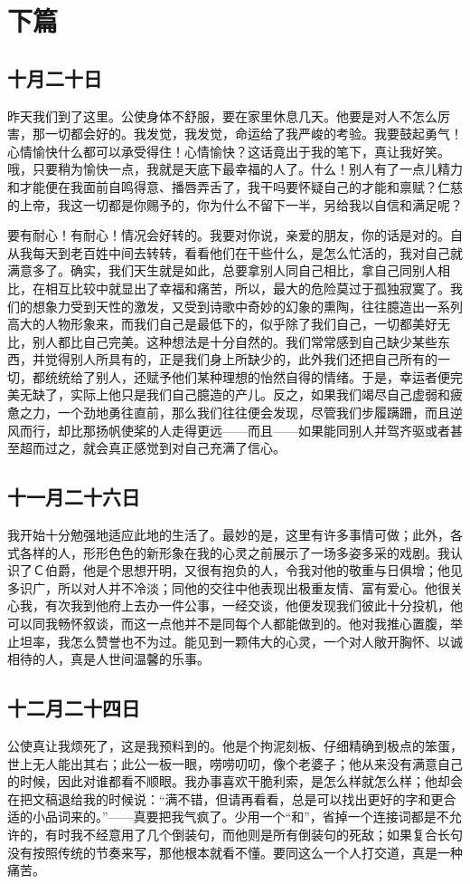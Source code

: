 \documentclass[12pt,oneside]{book}
\begin{document}
\part{下篇}
\label{sec-3}
\chapter{十月二十日}
\label{sec-3-1}
昨天我们到了这里。公使身体不舒服，要在家里休息几天。他要是对人不怎么厉害，那一切都会好的。我发觉，我发觉，命运给了我严峻的考验。我要鼓起勇气！心情愉快什么都可以承受得住！心情愉快？这话竟出于我的笔下，真让我好笑。哦，只要稍为愉快一点，我就是天底下最幸福的人了。什么！别人有了一点儿精力和才能便在我面前自鸣得意、播唇弄舌了，我干吗要怀疑自己的才能和禀赋？仁慈的上帝，我这一切都是你赐予的，你为什么不留下一半，另给我以自信和满足呢？

要有耐心！有耐心！情况会好转的。我要对你说，亲爱的朋友，你的话是对的。自从我每天到老百姓中间去转转，看看他们在干些什么，是怎么忙活的，我对自己就满意多了。确实，我们天生就是如此，总要拿别人同自己相比，拿自己同别人相比，在相互比较中就显出了幸福和痛苦，所以，最大的危险莫过于孤独寂寞了。我们的想象力受到天性的激发，又受到诗歌中奇妙的幻象的熏陶，往往臆造出一系列高大的人物形象来，而我们自己是最低下的，似乎除了我们自己，一切都美好无比，别人都比自己完美。这种想法是十分自然的。我们常常感到自己缺少某些东西，并觉得别人所具有的，正是我们身上所缺少的，此外我们还把自己所有的一切，都统统给了别人，还赋予他们某种理想的怡然自得的情绪。于是，幸运者便完美无缺了，实际上他只是我们自己臆造的产儿。反之，如果我们竭尽自己虚弱和疲惫之力，一个劲地勇往直前，那么我们往往便会发现，尽管我们步履蹒跚，而且逆风而行，却比那扬帆使桨的人走得更远——而且——如果能同别人并驾齐驱或者甚至超而过之，就会真正感觉到对自己充满了信心。
　　

\chapter{十一月二十六日}
\label{sec-3-2}
我开始十分勉强地适应此地的生活了。最妙的是，这里有许多事情可做；此外，各式各样的人，形形色色的新形象在我的心灵之前展示了一场多姿多采的戏剧。我认识了Ｃ伯爵，他是个思想开明，又很有抱负的人，令我对他的敬重与日俱增；他见多识广，所以对人并不冷淡；同他的交往中他表现出极重友情、富有爱心。他很关心我，有次我到他府上去办一件公事，一经交谈，他便发现我们彼此十分投机，他可以同我畅怀叙谈，而这一点他并不是同每个人都能做到的。他对我推心置腹，举止坦率，我怎么赞誉也不为过。能见到一颗伟大的心灵，一个对人敞开胸怀、以诚相待的人，真是人世间温馨的乐事。
　

\chapter{十二月二十四日}
\label{sec-3-3}
公使真让我烦死了，这是我预料到的。他是个拘泥刻板、仔细精确到极点的笨蛋，世上无人能出其右；此公一板一眼，唠唠叨叨，像个老婆子；他从来没有满意自己的时候，因此对谁都看不顺眼。我办事喜欢干脆利索，是怎么样就怎么样；他却会在把文稿退给我的时候说：“满不错，但请再看看，总是可以找出更好的字和更合适的小品词来的。”——真要把我气疯了。少用一个“和”，省掉一个连接词都是不允许的，有时我不经意用了几个倒装句，而他则是所有倒装句的死敌；如果复合长句没有按照传统的节奏来写，那他根本就看不懂。要同这么一个人打交道，真是一种痛苦。
\end{document}
